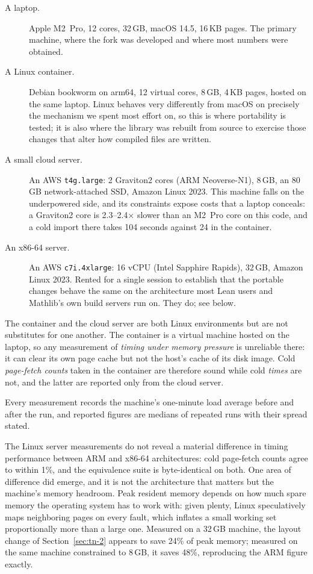 \documentclass{article}
\newcommand{\Lean}{Lean\xspace}      %
\newcommand{\mathlib}{Mathlib\xspace}
\begin{document}
\begin{description}
\item[A laptop.] Apple M2~Pro, 12 cores, 32\,GB, macOS 14.5, 16\,KB pages. The primary machine, where the fork was developed and where most numbers were obtained.
\item[A Linux container.] Debian bookworm on arm64, 12 virtual cores, 8\,GB, 4\,KB pages, hosted on the same laptop. Linux behaves very differently from macOS on precisely the mechanism we spent most effort on, so this is where portability is tested; it is also where the library was rebuilt from source to exercise those changes that alter how compiled files are written.
\item[A small cloud server.] An AWS \texttt{t4g.large}: 2 Graviton2 cores (ARM Neoverse-N1), 8\,GB, an 80\,GB network-attached SSD, Amazon Linux 2023. This machine falls on the underpowered side, and its constraints expose costs that a laptop conceals: a Graviton2 core is 2.3--2.4$\times$ slower than an M2~Pro core on this code, and a cold import there takes 104 seconds against 24 in the container.
\item[An x86-64 server.] An AWS \texttt{c7i.4xlarge}: 16 vCPU (Intel Sapphire Rapids), 32\,GB, Amazon Linux 2023. Rented for a single session to establish that the portable changes behave the same on the architecture most \Lean users and \mathlib's own build servers run on. They do; see below.
\end{description}

The container and the cloud server are both Linux environments but are not substitutes for one another. The container is a virtual machine hosted on the laptop, so any measurement of \emph{timing under memory pressure} is unreliable there: it can clear its own page cache but not the host's cache of its disk image. Cold \emph{page-fetch counts} taken in the container are therefore sound while cold \emph{times} are not, and the latter are reported only from the cloud server.

Every measurement records the machine's one-minute load average before and after the run, and reported figures are medians of repeated runs with their spread stated. 

The Linux server measurements do not reveal a material difference in timing performance between ARM and x86-64 architectures: cold page-fetch counts agree to within 1\%, and the equivalence suite is byte-identical on both. One area of difference did emerge, and it is not the architecture that matters but the machine's memory headroom. Peak resident memory depends on how much spare memory the operating system has to work with: given plenty, Linux speculatively maps neighboring pages on every fault, which inflates a small working set proportionally more than a large one. Measured on a 32\,GB machine, the layout change of Section~\ref{sec:tn-2} appears to save 24\% of peak memory; measured on the same machine constrained to 8\,GB, it saves 48\%, reproducing the ARM figure exactly. 
\end{document}
